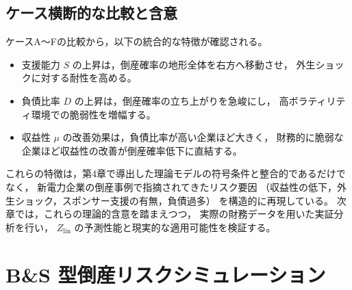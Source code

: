 \subsection{ケース横断的な比較と含意}

ケースA〜Fの比較から，以下の統合的な特徴が確認される。

\begin{itemize}
    \item 支援能力 $S$ の上昇は，倒産確率の地形全体を右方へ移動させ，
          外生ショックに対する耐性を高める。
    \item 負債比率 $D$ の上昇は，倒産確率の立ち上がりを急峻にし，
          高ボラティリティ環境での脆弱性を増幅する。
    \item 収益性 $\mu$ の改善効果は，負債比率が高い企業ほど大きく，
          財務的に脆弱な企業ほど収益性の改善が倒産確率低下に直結する。
\end{itemize}

これらの特徴は，第4章で導出した理論モデルの符号条件と整合的であるだけでなく，
新電力企業の倒産事例で指摘されてきたリスク要因
（収益性の低下，外生ショック，スポンサー支援の有無，負債過多）
を構造的に再現している。
次章では，これらの理論的含意を踏まえつつ，
実際の財務データを用いた実証分析を行い，
$Z_{\text{lin}}$ の予測性能と現実的な適用可能性を検証する。



\section{B\&S 型倒産リスクシミュレーション}
\label{sec:bs_risk_simulation}

